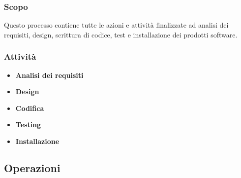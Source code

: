 \subsubsection{Scopo} Questo processo contiene tutte le azioni e attività finalizzate ad analisi dei requisiti, design, scrittura di codice, test e installazione dei prodotti software.
\subsubsection{Attività}
\begin{itemize}
    \item \textbf{Analisi dei requisiti} 
    \item \textbf{Design} 
    \item \textbf{Codifica} 
    \item \textbf{Testing} 
    \item \textbf{Installazione} 
\end{itemize}

\subsection{Operazioni}


